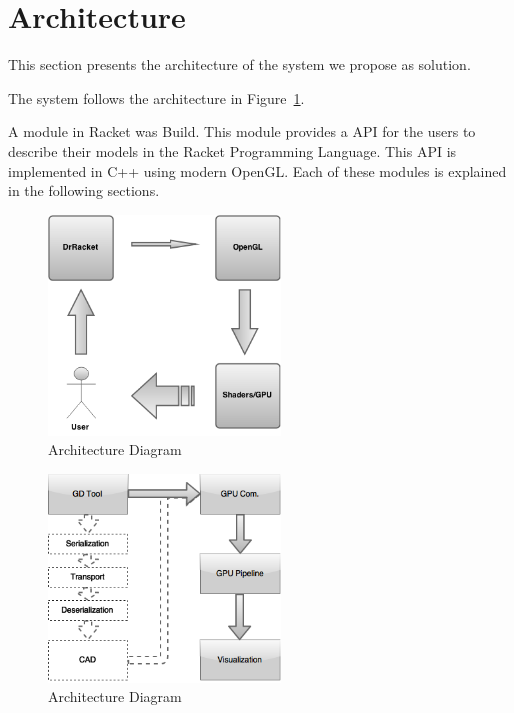 

\section{Architecture} %
\label{sec:architecture}
This section presents the architecture of the system we propose as solution.

The system follows the architecture in Figure~\ref{fig:architecture1}.

A module in Racket was Build. This module provides a \gls{API} for the users to describe their models in the Racket Programming Language.
This \gls{API} is implemented in C++ using modern OpenGL. Each of these modules is explained in the following sections.

\begin{figure}[h!]
	\centering
	\includegraphics[width=0.55\textwidth]{images/Architecture/architecture1.png}
	\caption{Architecture Diagram}
	\label{fig:architecture1}
\end{figure}


\begin{figure}[h!]
	\centering
	\includegraphics[width=0.55\textwidth]{images/Architecture/GD-Fast-Pipeline.png}
	\caption{Architecture Diagram}
	\label{fig:architecture2}
\end{figure}

